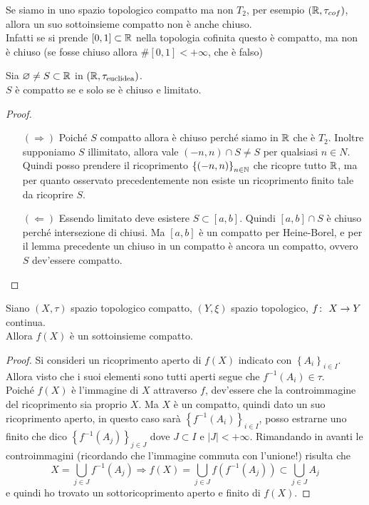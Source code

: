 \begin{remark}
	Se siamo in uno spazio topologico compatto ma non $T_2$, per esempio $(\mathbb{R}, \tau_{cof})$, allora un suo sottoinsieme compatto non è anche chiuso. \\ Infatti se si prende $\left[0,1\right] \subset \mathbb{R}$ nella topologia cofinita questo è compatto, ma non è chiuso (se fosse chiuso allora $\#\left[0,1\right] < +\infty$, che è falso)
\end{remark}

\begin{corollary}
	Sia $\varnothing \neq S \subset \mathbb{R}$ in $(\mathbb{R}, \tau_{\text{euclidea}})$. \\ $S$ è compatto se e solo se è chiuso e limitato. 
\end{corollary} 
\begin{proof}\
	\begin{enumerate}
		\item[$(\Rightarrow)$] Poiché $S$ compatto allora è chiuso perché siamo in $\mathbb{R}$ che è $T_2$. Inoltre supponiamo $S$ illimitato, allora vale $(-n, n) \cap S \neq S$ per qualsiasi $n \in N$. Quindi posso prendere il ricoprimento $\left\{(-n,n)\right\}_{n\in \mathbb{N}}$ che ricopre tutto $\mathbb{R}$, ma per quanto osservato precedentemente non esiste un ricoprimento finito tale da ricoprire $S$.
		\item[$(\Leftarrow)$] Essendo limitato deve esistere $S\subset \left[a,b\right]$. Quindi $\left[a,b\right] \cap S$ è chiuso perché intersezione di chiusi. Ma $\left[a,b\right]$ è un compatto per Heine-Borel, e per il lemma precedente un chiuso in un compatto è ancora un compatto, ovvero $S$ dev'essere compatto.
	\end{enumerate}	
\end{proof}

\begin{theorem}
	Siano $(X, \tau)$ spazio topologico compatto, $(Y, \xi)$ spazio topologico, $f \colon\ X \rightarrow Y$ continua. \\ Allora $f(X)$ è un sottoinsieme compatto. 
\end{theorem} 
\begin{proof}
	Si consideri un ricoprimento aperto di $f(X)$ indicato con $\left\{A_i\right\}_{i \in I}$. Allora visto che i suoi elementi sono tutti aperti segue che $f^{-1}(A_i) \in \tau$. \\ Poiché $f(X)$ è l'immagine di $X$ attraverso $f$, dev'essere che la controimmagine del ricoprimento sia proprio $X$. Ma $X$ è un compatto, quindi dato un suo ricoprimento aperto, in questo caso sarà $\left\{f^{-1}(A_i)\right\}_{i \in I}$, posso estrarne uno finito che dico $\left\{f^{-1}(A_j)\right\}_{j \in J}$ dove $J \subset I$ e $|J| < +\infty$. Rimandando in avanti le controimmagini (ricordando che l'immagine commuta con l'unione!) risulta che
	\begin{equation*}
		X = \bigcup_{j \in J} f^{-1}(A_j) \Longrightarrow f(X) = \bigcup_{j \in J} f(f^{-1}(A_j)) \subset \bigcup_{j \in J} A_j
	\end{equation*}
	e quindi ho trovato un sottoricoprimento aperto e finito di $f(X)$.
\end{proof}

